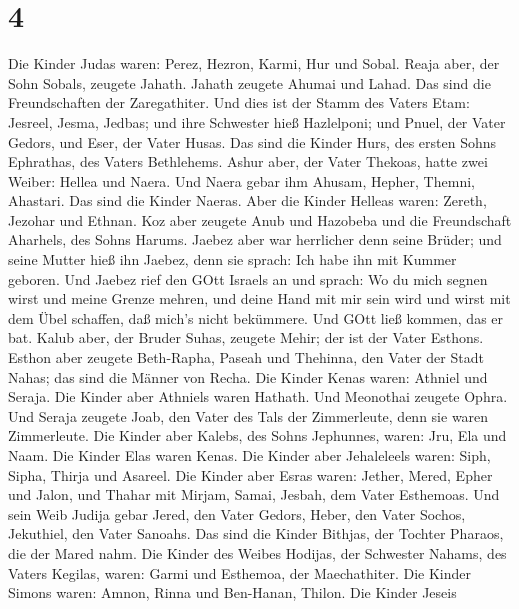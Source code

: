 \hypertarget{section-3}{%
\section{4}\label{section-3}}

 Die Kinder Judas waren: Perez, Hezron, Karmi, Hur und
Sobal.  Reaja aber, der Sohn Sobals, zeugete Jahath. Jahath
zeugete Ahumai und Lahad. Das sind die Freundschaften der Zaregathiter.
 Und dies ist der Stamm des Vaters Etam: Jesreel, Jesma,
Jedbas; und ihre Schwester hieß Hazlelponi;  und Pnuel, der
Vater Gedors, und Eser, der Vater Husas. Das sind die Kinder Hurs, des
ersten Sohns Ephrathas, des Vaters Bethlehems.  Ashur aber,
der Vater Thekoas, hatte zwei Weiber: Hellea und Naera.  Und
Naera gebar ihm Ahusam, Hepher, Themni, Ahastari. Das sind die Kinder
Naeras.  Aber die Kinder Helleas waren: Zereth, Jezohar und
Ethnan.  Koz aber zeugete Anub und Hazobeba und die
Freundschaft Aharhels, des Sohns Harums.  Jaebez aber war
herrlicher denn seine Brüder; und seine Mutter hieß ihn Jaebez, denn sie
sprach: Ich habe ihn mit Kummer geboren.  Und Jaebez rief
den GOtt Israels an und sprach: Wo du mich segnen wirst und meine Grenze
mehren, und deine Hand mit mir sein wird und wirst mit dem Übel
schaffen, daß mich's nicht bekümmere. Und GOtt ließ kommen, das er bat.
 Kalub aber, der Bruder Suhas, zeugete Mehir; der ist der
Vater Esthons.  Esthon aber zeugete Beth-Rapha, Paseah und
Thehinna, den Vater der Stadt Nahas; das sind die Männer von Recha.
 Die Kinder Kenas waren: Athniel und Seraja. Die Kinder
aber Athniels waren Hathath.  Und Meonothai zeugete Ophra.
Und Seraja zeugete Joab, den Vater des Tals der Zimmerleute, denn sie
waren Zimmerleute.  Die Kinder aber Kalebs, des Sohns
Jephunnes, waren: Jru, Ela und Naam. Die Kinder Elas waren Kenas.
 Die Kinder aber Jehaleleels waren: Siph, Sipha, Thirja und
Asareel.  Die Kinder aber Esras waren: Jether, Mered, Epher
und Jalon, und Thahar mit Mirjam, Samai, Jesbah, dem Vater Esthemoas.
 Und sein Weib Judija gebar Jered, den Vater Gedors, Heber,
den Vater Sochos, Jekuthiel, den Vater Sanoahs. Das sind die Kinder
Bithjas, der Tochter Pharaos, die der Mared nahm.  Die
Kinder des Weibes Hodijas, der Schwester Nahams, des Vaters Kegilas,
waren: Garmi und Esthemoa, der Maechathiter.  Die Kinder
Simons waren: Amnon, Rinna und Ben-Hanan, Thilon. Die Kinder Jeseis

